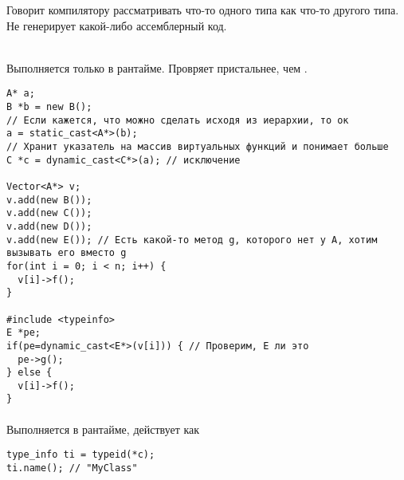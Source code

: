   Говорит компилятору рассматривать что-то одного типа как что-то другого типа. Не генерирует какой-либо ассемблерный код. \\\\

    Выполняется только в рантайме. Провряет пристальнее, чем .
  \begin{verbatim}
A* a;
B *b = new B();
// Если кажется, что можно сделать исходя из иерархии, то ок
a = static_cast<A*>(b);
// Хранит указатель на массив виртуальных функций и понимает больше
C *c = dynamic_cast<C*>(a); // исключение

Vector<A*> v;
v.add(new B());
v.add(new C());
v.add(new D());
v.add(new E()); // Есть какой-то метод g, которого нет у A, хотим вызывать его вместо g
for(int i = 0; i < n; i++) {
  v[i]->f();
}

#include <typeinfo>
E *pe;
if(pe=dynamic_cast<E*>(v[i])) { // Проверим, E ли это
  pe->g();
} else {
  v[i]->f();
}
  \end{verbatim}

\paragraph*{}
Выполняется в рантайме, действует как 
\begin{verbatim}
type_info ti = typeid(*c);
ti.name(); // "MyClass"
\end{verbatim}

